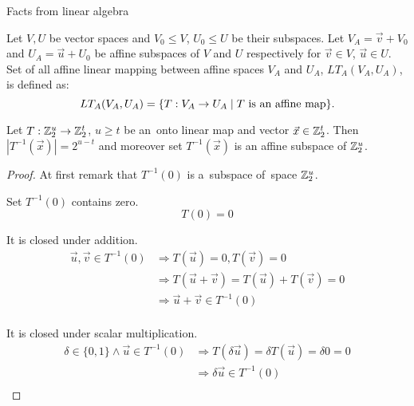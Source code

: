 \begin{chapter}{Facts from linear algebra}
\begin{definition}
Let $V, U$ be vector spaces and $V_0 \leq V$, $U_0 \leq U$ be their subspaces. Let $V_A = \vec{v} + V_0$ and $U_A = \vec{u} + U_0$ be affine subspaces of $V$ and $U$ respectively for $\vec{v} \in V$, $\vec{u} \in U$. Set of all affine linear mapping between affine spaces $V_A$ and $U_A$, $LT_A(V_A, U_A)$, is defined as:
\[
	LT_A(V_A, U_A) = \{ T: V_A \rightarrow U_A \mid T \text{ is an affine map} \} \text{.}
\]
\end{definition}

\begin{lemma}
\label{lemma-linear-transformation-domain-distribution}
Let $T: \mathbb{Z}_{2}^{u} \rightarrow \mathbb{Z}_{2}^{t}$, $u \geq t$ be an~onto linear map and vector $\vec{x} \in \mathbb{Z}_{2}^{t}$. Then $|T^{-1}(\vec{x})| = 2 ^ {u - t}$ and moreover set $T^{-1}(\vec{x})$ is an affine subspace of $\mathbb{Z}_{2}^{u}$.
\end{lemma}
\begin{proof}
At first remark that $T^{-1}(0)$ is a~subspace of~space $\mathbb{Z}_{2}^{u}$.

Set $T^{-1}(0)$ contains zero.
\[ T(0) = 0 \]

It is closed under addition.
\[
\begin{split}
\vec{u}, \vec{v} \in T^{-1}(0) 
	& \Rightarrow T(\vec{u}) = 0, T(\vec{v}) = 0 \\ 
	& \Rightarrow T(\vec{u} + \vec{v}) = T(\vec{u}) + T(\vec{v}) = 0 \\ 
	& \Rightarrow \vec{u} + \vec{v} \in T^{-1}(0) \\
\end{split}
\]

It is closed under scalar multiplication.
\[
\begin{split}
\delta \in \{0, 1\} \wedge \vec{u} \in T^{-1}(0) 
	& \Rightarrow T(\delta \vec{u}) = \delta T(\vec{u}) = \delta 0 = 0 \\
	& \Rightarrow \delta \vec{u} \in T^{-1}(0) \\
\end{split}
\]


\end{proof}
\end{chapter}
